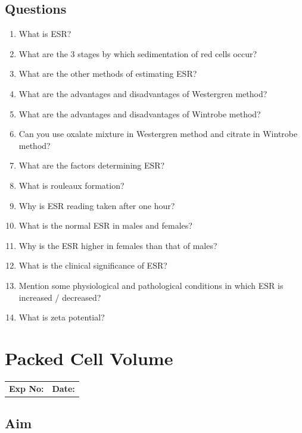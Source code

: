 \documentclass[a4paper,12pt]{book}
\begin{document}
												\section*{Questions}
												\begin{enumerate}
													\item{What is ESR?}
													\item{What are the 3 stages by which sedimentation of red cells occur?}
													\item{What are the other methods of estimating ESR?}
													\item{What are the advantages and disadvantages of Westergren method?}
													\item{What are the advantages and disadvantages of Wintrobe method?}
													\item{Can you use oxalate mixture in Westergren method and citrate in Wintrobe method?}
													\item{What are the factors determining ESR?}
													\item{What is rouleaux formation?}
													\item{Why is ESR reading taken after one hour?}
													\item{What is the normal ESR in males and females?}
													\item{Why is the ESR higher in females than that of males?}
													\item{What is the clinical significance of ESR?}
													\item{Mention some physiological and pathological conditions in which ESR is increased / decreased?}
													\item{What is zeta potential?}
												\end{enumerate}

												\chapter*{\centering Packed Cell Volume}
												\begin{tabular}{p{5in} p{1in}}
													\textbf{Exp No:}  & \textbf{Date:}\\
												\end{tabular}

												\section*{Aim}
\end{document}
